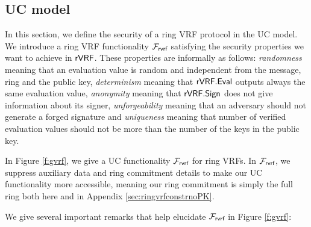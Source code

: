 
\subsection{UC model}
\label{subsec:uc_model}

In this section, we define the security of  a ring VRF protocol in the UC model. We introduce a ring VRF functionality $ \mathcal{F}_{\textsf{rvrf}} $ satisfying the security properties we want to achieve in $ {\mathsf{rVRF}} $. These properties are informally as follows: \emph{randomness} meaning that an evaluation value is random and independent from the message, ring and the public key, \emph{determinism} meaning that $ {\mathsf{rVRF}}.{\mathsf{Eval}} $ outputs always the same evaluation value, \emph{anonymity} meaning that $ {\mathsf{rVRF}}.{\mathsf{Sign}} $ does not give information about its signer, \emph{unforgeability} meaning that an adversary should not generate a forged signature and \emph{uniqueness} meaning that number of verified evaluation values should not be more than the number of the keys in the public key.

In Figure \ref{f:gvrf}, we give a UC functionality $\mathcal{F}_{\textsf{rvrf}}$ for ring VRFs.  In $\mathcal{F}_{\textsf{rvrf}}$, we suppress
auxiliary data and ring commitment details to make our UC functionality
more accessible, meaning our ring commitment is simply the full ring both
here and in Appendix \ref{sec:ringvrfconstrnoPK}.

We give several important remarks that help elucidate $\mathcal{F}_{\textsf{rvrf}}$ in Figure \ref{f:gvrf}:



